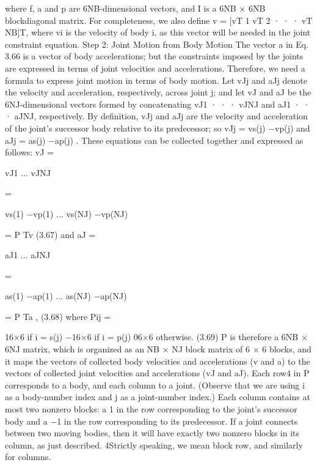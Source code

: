 where f, a and p are 6NB-dimensional vectors, and I is a 6NB × 6NB blockdiagonal matrix. For completeness, we also define v = [vT 1 vT 2 · · · vT NB]T, where vi is the velocity of body i, as this vector will be needed in the joint constraint equation. Step 2: Joint Motion from Body Motion The vector a in Eq. 3.66 is a vector of body accelerations; but the constraints imposed by the joints are expressed in terms of joint velocities and accelerations. Therefore, we need a formula to express joint motion in terms of body motion. Let vJj and aJj denote the velocity and acceleration, respectively, across joint j; and let vJ and aJ be the 6NJ-dimensional vectors formed by concatenating vJ1 · · · vJNJ and aJ1 · · · aJNJ, respectively. By definition, vJj and aJj are the velocity and acceleration of the joint’s successor body relative to its predecessor; so vJj = vs(j) −vp(j) and aJj = as(j) −ap(j) . These equations can be collected together and expressed as follows: vJ =

vJ1 ... vJNJ

=

vs(1) −vp(1) ... vs(NJ) −vp(NJ)

= P Tv (3.67) and aJ =

aJ1 ... aJNJ

=

as(1) −ap(1) ... as(NJ) −ap(NJ)

= P Ta , (3.68) where Pij =

16×6 if i = s(j) −16×6 if i = p(j) 06×6 otherwise. (3.69) P is therefore a 6NB × 6NJ matrix, which is organized as an NB × NJ block matrix of 6 × 6 blocks, and it maps the vectors of collected body velocities and accelerations (v and a) to the vectors of collected joint velocities and accelerations (vJ and aJ). Each row4 in P corresponds to a body, and each column to a joint. (Observe that we are using i as a body-number index and j as a joint-number index.) Each column contains at most two nonzero blocks: a 1 in the row corresponding to the joint’s successor body and a −1 in the row corresponding to its predecessor. If a joint connects between two moving bodies, then it will have exactly two nonzero blocks in its column, as just described. 4Strictly speaking, we mean block row, and similarly for columns.

